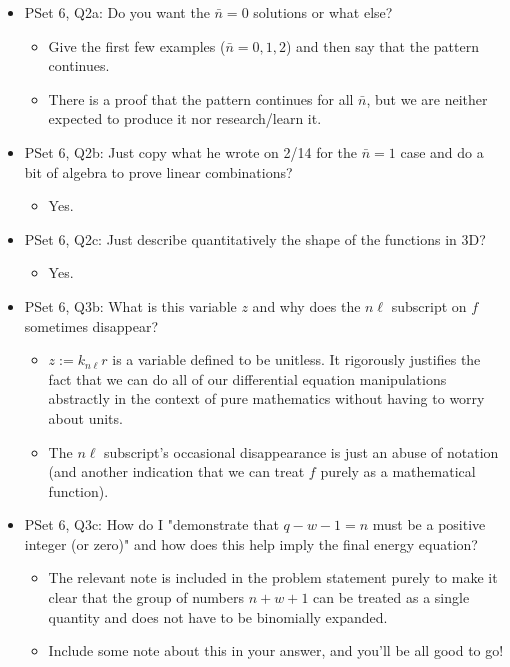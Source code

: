 \documentclass[../notes.tex]{subfiles}
\begin{document}
\begin{itemize}
\begin{itemize}
    \end{itemize}
    \item PSet 6, Q2a: Do you want the $\bar{n}=0$ solutions or what else?
    \begin{itemize}
        \item Give the first few examples ($\bar{n}=0,1,2$) and then say that the pattern continues.
        \item There is a proof that the pattern continues for all $\bar{n}$, but we are neither expected to produce it nor research/learn it.
    \end{itemize}
    \item PSet 6, Q2b: Just copy what he wrote on 2/14 for the $\bar{n}=1$ case and do a bit of algebra to prove linear combinations?
    \begin{itemize}
        \item Yes.
    \end{itemize}
    \item PSet 6, Q2c: Just describe quantitatively the shape of the functions in 3D?
    \begin{itemize}
        \item Yes.
    \end{itemize}
    \item PSet 6, Q3b: What is this variable $z$ and why does the $n\ell$ subscript on $f$ sometimes disappear?
    \begin{itemize}
        \item $z:=k_{n\ell}r$ is a variable defined to be unitless. It rigorously justifies the fact that we can do all of our differential equation manipulations abstractly in the context of pure mathematics without having to worry about units.
        \item The $n\ell$ subscript's occasional disappearance is just an abuse of notation (and another indication that we can treat $f$ purely as a mathematical function).
    \end{itemize}
    \item PSet 6, Q3c: How do I "demonstrate that $q-w-1=n$ must be a positive integer (or zero)" and how does this help imply the final energy equation?
    \begin{itemize}
        \item The relevant note is included in the problem statement purely to make it clear that the group of numbers $n+w+1$ can be treated as a single quantity and does not have to be binomially expanded.
        \item Include some note about this in your answer, and you'll be all good to go!
    \end{itemize}
\end{itemize}
\end{document}
